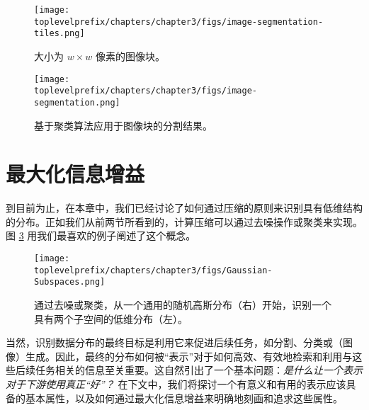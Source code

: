 \documentclass[../../book-main_zh.tex]{subfiles}
\begin{document}
\begin{figure}
	\centering
	\texttt{[image: \\toplevelprefix/chapters/chapter3/figs/image-segmentation-tiles.png]}
	\caption{大小为 $w\times w$ 像素的图像块。}
	\label{fig:image-patch}
\end{figure}

\begin{figure}[th]
	\centering
	\texttt{[image: \\toplevelprefix/chapters/chapter3/figs/image-segmentation.png]}
	\caption{基于聚类算法应用于图像块的分割结果。}
	\label{fig:image-segmentation}
\end{figure}

\section{最大化信息增益}
\label{sec:chap4-representation-learning-problem}




到目前为止，在本章中，我们已经讨论了如何通过压缩的原则来识别具有低维结构的分布。正如我们从前两节所看到的，计算压缩可以通过去噪操作或聚类来实现。图 \ref{fig:Gaussian-Subspaces} 用我们最喜欢的例子阐述了这个概念。
\begin{figure}[t]
    \centering
    \texttt{[image: \\toplevelprefix/chapters/chapter3/figs/Gaussian-Subspaces.png]}
    \caption{通过去噪或聚类，从一个通用的随机高斯分布（右）开始，识别一个具有两个子空间的低维分布（左）。}
    \label{fig:Gaussian-Subspaces}
\end{figure}
当然，识别数据分布的最终目标是利用它来促进后续任务，如分割、分类或（图像）生成。因此，最终的分布如何被“表示”对于如何高效、有效地检索和利用与这些后续任务相关的信息至关重要。这自然引出了一个基本问题：{\em 是什么让一个表示对于下游使用真正“好”？} 在下文中，我们将探讨一个有意义和有用的表示应该具备的基本属性，以及如何通过最大化信息增益来明确地刻画和追求这些属性。

\end{document}
